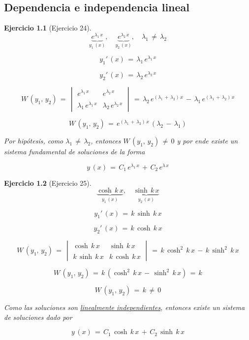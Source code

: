 \documentclass[a4paper,11pt, openany]{book}
\newtheorem{ejer}{Ejercicio}[section]
\begin{document}
\textcolor{awesome}{\chapter{Dependencia e independencia lineal}}  
 
\begin{ejer}[Ejercicio 24]
 
$$\underbrace{e^{\lambda_{1}\,x}}_{y_{1}\,(x)}, \quad \underbrace{e^{\lambda_{2}\,x}}_{y_{2}\,(x)}, \quad \lambda_{1}\,\neq\,\lambda_{2}$$
 
$$y_{1}'\,(x)\,=\,\lambda_{1}\,e^{\lambda_{1}\,x}$$
 
$$y_{2}'\,(x)\,=\,\lambda_{2}\,e^{\lambda_{2}\,x}$$
 
$$W\,\left(y_{1},\,y_{2} \right)\,=\,\begin{vmatrix}
e^{\lambda_{1}\,x} & e^{\lambda_{2}\,x} \\
\\
\lambda_{1}\,e^{\lambda_{1}\,x} & \lambda_{2}\,e^{\lambda_{2}\,x} 
\end{vmatrix}\,=\,\lambda_{2}\,e^{(\lambda_{1}\,+\,\lambda_{2})\,x}\,-\,\lambda_{1}\,e^{(\lambda_{1}\,+\,\lambda_{2})\,x}$$
 
$$W\,\left(y_{1},\,y_{2} \right)\,=\,e^{(\lambda_{1}\,+\,\lambda_{2})\,x}\,\left(\lambda_{2}\,-\,\lambda_{1} \right)$$
 
Por hipótesis, como $\lambda_{1}\,\neq\,\lambda_{2}$, entonces $W\,\left(y_{1},\,y_{2} \right)\,\neq\,0$ y por ende existe un sistema fundamental de soluciones de la forma
 
$$\boxed{y\,(x)\,=\,C_{1}\,e^{\lambda_{1}\,x}\,+\,C_{2}\,e^{\lambda\,x}}$$

\end{ejer}
 
\begin{ejer}[Ejercicio 25]
 
 
$$\underbrace{\cosh\,k\,x}_{y_{1}\,(x)}, \quad \underbrace{\sinh\,k\,x}_{y_{2}\,(x)}$$
 
$$y_{1}'\,(x)\,=\,k\,\sinh\,k\,x$$
 
$$y_{2}'\,(x)\,=\,k\,\cosh\,k\,x$$
 
$$W\,\left(y_{1},\,y_{2} \right)\,=\,\begin{vmatrix}
\cosh\,k\,x & \sinh\,k\,x \\
\\
k\,\sinh\,k\,x & k\,\cosh\,k\,x
\end{vmatrix}\,=\,k\,\cosh^{2}\,k\,x\,-\,k\,\sinh^{2}\,k\,x$$
 
$$W\,\left(y_{1},\,y_{2} \right)\,=\,k\,\left(\cosh^{2}\,k\,x\,-\,\sinh^{2}\,k\,x \right)\,=\,k$$
 
$$W\,\left(y_{1},\,y_{2} \right)\,=\,\boxed{k\,\neq\,0}$$
 
Como las soluciones son \underline{linealmente independientes}, entonces existe un sistema de soluciones dado por
 
$$\boxed{y\,(x)\,=\,C_{1}\,\cosh\,k\,x\,+\,C_{2}\,\sinh\,k\,x}$$

\end{ejer}
 
\end{document}
